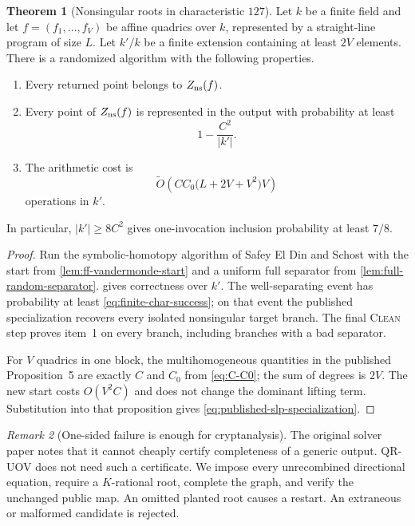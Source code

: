 \documentclass[11pt,a4paper]{article}
\theoremstyle{definition}
\newtheorem{theorem}{Theorem}[section]
\theoremstyle{remark}
\newtheorem{remark}[theorem]{Remark}
\newcommand{\softO}{\widetilde O}
\begin{document}
\begin{theorem}[Nonsingular roots in characteristic $127$]\label{thm:finite-char-nonsingular}
Let $k$ be a finite field and let $f=(f_1,\ldots,f_V)$ be affine quadrics over $k$, represented by a straight-line program of size $L$.  Let $k'/k$ be a finite extension containing at least $2V$ elements.  There is a randomized algorithm with the following properties.

\begin{enumerate}
\item Every returned point belongs to $Z_{\rm ns}(f)$.
\item Every point of $Z_{\rm ns}(f)$ is represented in the output with probability at least
\begin{equation}\label{eq:finite-char-success}
 1-\frac{C^2}{|k'|}.
\end{equation}
\item The arithmetic cost is
\begin{equation}\label{eq:published-slp-specialization}
 \softO\!\left(
 C C_0\bigl(L+2V+V^2\bigr)V
 \right)
\end{equation}
operations in $k'$.
\end{enumerate}
In particular, $|k'|\ge8C^2$ gives one-invocation inclusion probability at least $7/8$.
\end{theorem}

\begin{proof}
Run the symbolic-homotopy algorithm of Safey El Din and Schost with the start from \cref{lem:ff-vandermonde-start} and a uniform full separator from \cref{lem:full-random-separator}.   gives correctness over $k'$.  The well-separating event has probability at least \eqref{eq:finite-char-success}; on that event the published specialization recovers every isolated nonsingular target branch.  The final \textsc{Clean} step proves item~1 on every branch, including branches with a bad separator.

For $V$ quadrics in one block, the multihomogeneous quantities in the published Proposition~5 are exactly $C$ and $C_0$ from \eqref{eq:C-C0}; the sum of degrees is $2V$.  The new start costs $O(V^2C)$ and does not change the dominant lifting term.  Substitution into that proposition gives \eqref{eq:published-slp-specialization}.
\end{proof}

\begin{remark}[One-sided failure is enough for cryptanalysis]\label{rem:one-sided-enough}
The original solver paper notes that it cannot cheaply certify completeness of a generic output.  QR-UOV does not need such a certificate.  We impose every unrecombined directional equation, require a $K$-rational root, complete the graph, and verify the unchanged public map.  An omitted planted root causes a restart.  An extraneous or malformed candidate is rejected.
\end{remark}
\end{document}
